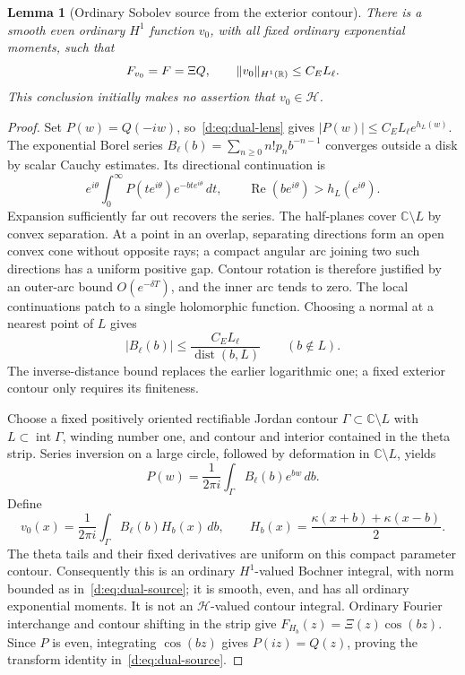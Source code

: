 \documentclass[11pt,a4paper]{article}
\numberwithin{equation}{section}
\newtheorem{lemma}[theorem]{Lemma}
\theoremstyle{definition}\newtheorem{definition}[theorem]{Definition}
\theoremstyle{remark}\newtheorem{remark}[theorem]{Remark}
\newcommand{\R}{\mathbb R}\newcommand{\C}{\mathbb C}\newcommand{\N}{\mathbb N}
\newcommand{\Hh}{\mathcal H}\newcommand{\Hw}{\mathcal H}
\begin{document}
\begin{lemma}[Ordinary Sobolev source from the exterior contour]\label{d:lem:dual-source}
There is a smooth even ordinary $H^1$ function $v_0$, with all fixed ordinary exponential moments, such that
\begin{equation}\label{d:eq:dual-source}
 F_{v_0}=F=\Xi Q,\qquad
 \norm{v_0}_{H^1(\R)}\le C_E L_\ell.
\end{equation}
This conclusion initially makes no assertion that $v_0\in\Hh$.
\end{lemma}
\begin{proof}
Set $P(w)=Q(-iw)$, so~\eqref{d:eq:dual-lens} gives
$|P(w)|\le C_E L_\ell e^{h_L(w)}$.
The exponential Borel series $B_\ell(b)=\sum_{n\ge0}n!p_nb^{-n-1}$ converges outside a disk by scalar Cauchy estimates. Its directional continuation is
\[
 e^{i\theta}\int_0^\infty
       P(te^{i\theta})e^{-bte^{i\theta}}\,dt,
 \qquad\operatorname{Re}(be^{i\theta})>h_L(e^{i\theta}).
\]
Expansion sufficiently far out recovers the series. The half-planes cover $\C\setminus L$ by convex separation. At a point in an overlap, separating directions form an open convex cone without opposite rays; a compact angular arc joining two such directions has a uniform positive gap. Contour rotation is therefore justified by an outer-arc bound $O(e^{-\delta T})$, and the inner arc tends to zero. The local continuations patch to a single holomorphic function. Choosing a normal at a nearest point of $L$ gives
\begin{equation}\label{d:eq:dual-Borel}
 |B_\ell(b)|\le\frac{C_E L_\ell}{\operatorname{dist}(b,L)}
 \qquad(b\notin L).
\end{equation}
The inverse-distance bound replaces the earlier logarithmic one; a fixed exterior contour only requires its finiteness.

Choose a fixed positively oriented rectifiable Jordan contour $\Gamma\subset\C\setminus L$ with $L\subset\operatorname{int}\Gamma$, winding number one, and contour and interior contained in the theta strip. Series inversion on a large circle, followed by deformation in $\C\setminus L$, yields
\[
 P(w)=\frac1{2\pi i}\int_\Gamma B_\ell(b)e^{bw}\,db.
\]
Define
\begin{equation}\label{d:eq:dual-contour-source}
 v_0(x)=\frac1{2\pi i}\int_\Gamma B_\ell(b)H_b(x)\,db,
 \qquad H_b(x)=\frac{\kappa(x+b)+\kappa(x-b)}2.
\end{equation}
The theta tails and their fixed derivatives are uniform on this compact parameter contour. Consequently this is an ordinary $H^1$-valued Bochner integral, with norm bounded as in~\eqref{d:eq:dual-source}; it is smooth, even, and has all ordinary exponential moments. It is not an $\Hh$-valued contour integral. Ordinary Fourier interchange and contour shifting in the strip give $F_{H_b}(z)=\Xi(z)\cos(bz)$. Since $P$ is even, integrating $\cos(bz)$ gives $P(iz)=Q(z)$, proving the transform identity in~\eqref{d:eq:dual-source}.
\end{proof}
\end{document}
